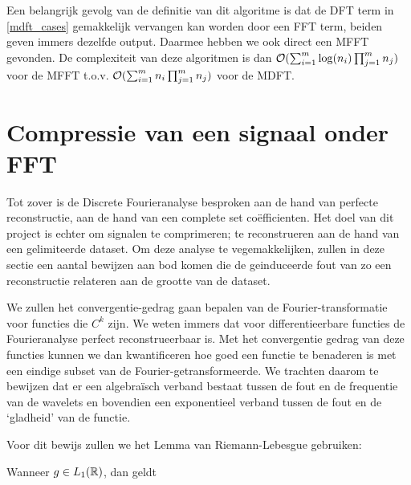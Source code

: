 Een belangrijk gevolg van de definitie van dit algoritme is dat de DFT term in \ref{mdft_cases}
gemakkelijk vervangen kan worden door een FFT term, beiden geven immers dezelfde output. 
Daarmee hebben we ook direct een MFFT gevonden.
De complexiteit van deze algoritmen is dan $\mathcal{O}( \sum_{i=1}^m \log(n_i) \prod_{j=1}^m n_j)$  voor de MFFT
t.o.v. $\mathcal{O}( \sum_{i=1}^m n_i \prod_{j=1}^m n_j)$ voor de MDFT.

\section{Compressie van een signaal onder FFT}
Tot zover is de Discrete Fourieranalyse besproken aan de hand van perfecte reconstructie, 
aan de hand van een  complete set co\"efficienten. Het doel van dit project is echter om
signalen te comprimeren; te reconstrueren aan de hand van een gelimiteerde dataset.
Om deze analyse te vegemakkelijken, zullen in deze sectie een aantal bewijzen aan bod komen die
de geinduceerde fout van zo een reconstructie relateren aan de grootte van de dataset.

We zullen het convergentie-gedrag gaan bepalen van de Fourier-transformatie voor functies die $C^k$ zijn.
We weten immers dat voor differentieerbare functies de Fourieranalyse perfect reconstrueerbaar is.
Met het convergentie gedrag van deze functies kunnen we dan kwantificeren hoe goed een functie te 
benaderen is met een eindige subset van de Fourier-getransformeerde.
We trachten daarom te bewijzen dat er een algebra\"isch verband bestaat tussen de fout en de frequentie
van de wavelets en bovendien een exponentieel verband tussen de fout en de `gladheid' van de functie.

Voor dit bewijs zullen we het Lemma van Riemann-Lebesgue gebruiken: 
\begin{lemm}
Wanneer $g \in L_1(\mathbb{R})$, dan geldt 
\end{lemm}

